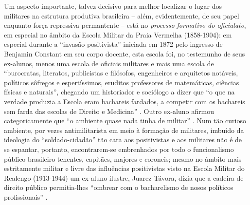 Um aspecto importante, talvez decisivo para melhor localizar o lugar dos militares na estrutura produtiva brasileira -- além, evidentemente, de seu papel enquanto força repressiva permantente -- está no \textit{processo formativo do oficialato}, em especial no âmbito da Escola Militar da Praia Vermelha (1858-1904): em especial durante a ``invasão positivista'' iniciada em 1872 pelo ingresso de Benjamin Constant em seu corpo docente, esta escola foi, no testemunho de seus ex-alunos, menos uma escola de oficiais militares e mais uma escola de ``burocratas, literatos, publicistas e filósofos, engenheiros e arquitetos notáveis, políticos sôfregos e espertíssimos, eruditos professores de matemáticas, ciências físicas e naturais'', chegando um historiador e sociólogo a dizer que ``o que na verdade produzia a Escola eram bachareis fardados, a competir com os bachareis sem farda das escolas de Direito e Medicina'' \cite[p.~196]{carvalho_militares_1977}. Outro ex-aluno afirmou categoricamente que ``o ambiente quase nada tinha de militar'' \cite[p.~196]{carvalho_militares_1977}. Num tão curioso ambiente, por vezes antimilitarista em meio à formação de militares, imbuído da ideologia do ``soldado-cidadão'' tão cara aos positivistas e aos militares  não é de se espantar, portanto, encontrarem-se embrenhados por todo o funcionalismo público brasileiro tenentes, capitães, majores e coroneis; mesmo no âmbito mais estritamente militar e livre das influências positivistas visto na Escola Militar do Realengo (1913-1944) um ex-aluno ilustre, Juarez Távora, dizia que a cadeira de direito público permitia-lhes ``ombrear com o bacharelismo de nosos políticos profissionais'' \cite[p.~211]{carvalho_militares_1977}.

